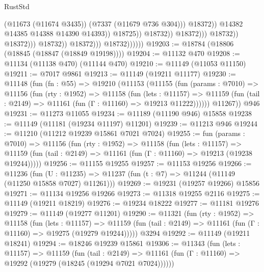 \begin{lexlean}{RustStd}
\begin{coremodule}
                                                            (@11673 (@11674 @3435))
                                                            (@7337 (@11679 @736 @304)))
                                                          @18372))
                                                      @14382
                                                      @14385
                                                      @14388
                                                      @14390
                                                      @14393))
                                                  @18725))
                                              @18732))
                                          @18372)))
                                    @18732))
                                @18372)))
                          @18732))
                      @18372)))
                @18732))))))
@19203 := @18784 (@18806 (@18845 (@18847 (@18849 @19198))))
@19204 := @11132 @470
@19208 := @11134 (@11138 @470) (@11144 @470)
@19210 := @11149 (@11053 @11150)
@19211 := @7017 @9861
@19213 := @11149 (@19211 @11177)
@19230 := @11148
    (fun (fn : @55) =>
    @19210
      (@11153
        (@11155
          (fun (params : @7010) =>
          @11156
            (fun (rty : @1952) =>
            @11158
              (fun (lets : @11157) =>
              @11159 (fun (tail : @2149) => @11161 (fun (Γ : @11160) => @19213 @11222))))))
        @11267))
    @946
@19231 := @11273 @11055
@19234 := @11189 (@11190 @946) @15858
@19238 := @11149 (@11181 (@19234 @11197) @11201)
@19239 := @11213 @946
@19244 := @11210 (@11212 @19239 @15861 @7021 @7024)
@19255 := fun (params : @7010) =>
  @11156
    (fun (rty : @1952) =>
    @11158
      (fun (lets : @11157) =>
      @11159 (fun (tail : @2149) => @11161 (fun (Γ : @11160) => @19213 (@19238 @19244)))))
@19256 := @11155 @19255
@19257 := @11153 @19256
@19266 := @11236
    (fun (U : @11235) => @11237 (fun (t : @7) => @11244 (@11149 (@11250 @15858 @7027) @11261)))
@19269 := @19231 (@19257 @19266) @15856
@19271 := @11134 @19256 @19266
@19273 := @11318 @19255 @2116
@19275 := @11149 (@19211 @18219)
@19276 := @19234 @18222
@19277 := @11181 @19276
@19279 := @11149 (@19277 @11201)
@19290 := @11321
    (fun (rty : @1952) =>
    @11158
      (fun (lets : @11157) =>
      @11159 (fun (tail : @2149) => @11161 (fun (Γ : @11160) => @19275 (@19279 @19244)))))
    @3294
@19292 := @11149 (@19211 @18241)
@19294 := @18246 @19239 @15861
@19306 := @11343
    (fun (lets : @11157) =>
    @11159
      (fun (tail : @2149) =>
      @11161 (fun (Γ : @11160) => @19292 (@19279 (@18245 (@19294 @7021 @7024))))))

\end{coremodule}
\end{lexlean}
